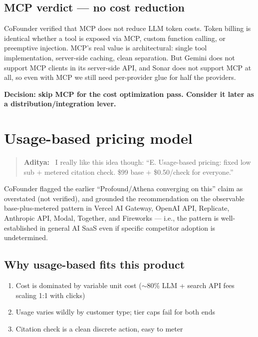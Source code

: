 \documentclass[11pt,letterpaper]{article}
\newenvironment{userturn}
  {\begin{quote}\small\color{brand}\textbf{Aditya:}~}
  {\end{quote}}
\begin{document}
\subsection{MCP verdict --- no cost reduction}

CoFounder verified that MCP does not reduce LLM token costs. Token billing
is identical whether a tool is exposed via MCP, custom function calling, or
preemptive injection. MCP's real value is architectural: single tool
implementation, server-side caching, clean separation. But Gemini does not
support MCP clients in its server-side API, and Sonar does not support MCP
at all, so even with MCP we still need per-provider glue for half the
providers.

\textbf{Decision: skip MCP for the cost optimization pass. Consider it later
as a distribution/integration lever.}

\section{Usage-based pricing model}

\begin{userturn}
I really like this idea though: ``E. Usage-based pricing: fixed low sub $+$
metered citation check. \$99 base $+$ \$0.50/check for everyone.''
\end{userturn}

CoFounder flagged the earlier ``Profound/Athena converging on this'' claim
as overstated (not verified), and grounded the recommendation on the
observable base-plus-metered pattern in Vercel AI Gateway, OpenAI API,
Replicate, Anthropic API, Modal, Together, and Fireworks --- i.e., the
pattern is well-established in general AI SaaS even if specific competitor
adoption is undetermined.

\subsection{Why usage-based fits this product}

\begin{enumerate}[nosep]
  \item Cost is dominated by variable unit cost ($\sim$80\% LLM + search API fees scaling 1:1 with clicks)
  \item Usage varies wildly by customer type; tier caps fail for both ends
  \item Citation check is a clean discrete action, easy to meter
\end{enumerate}
\end{document}
